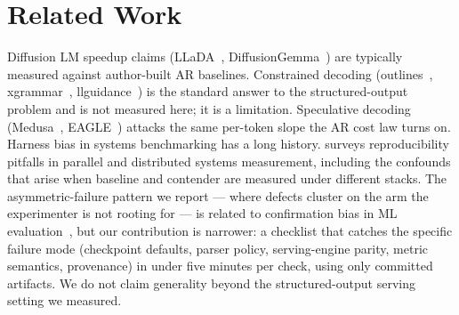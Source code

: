 \section{Related Work}
\label{sec:related} Diffusion LM speedup claims (LLaDA~\cite{llada2025},
DiffusionGemma~\cite{diffusiongemma}) are typically measured against
author-built AR baselines. Constrained decoding
(outlines~\cite{outlines2024}, xgrammar~\cite{xgrammar2024},
llguidance~\cite{llguidance}) is the standard answer to the structured-output
problem and is not measured here; it is a limitation. Speculative decoding
(Medusa~\cite{medusa2024}, EAGLE~\cite{eagle2024}) attacks the same per-token
slope the AR cost law turns on. Harness bias in systems benchmarking has a long history.
\cite{hoefler2021} surveys reproducibility pitfalls in parallel and
distributed systems measurement, including the confounds that arise when
baseline and contender are measured under different stacks. The
asymmetric-failure pattern we report --- where defects cluster on the arm
the experimenter is not rooting for --- is related to confirmation bias in
ML evaluation~\cite{hoefler2021}, but our contribution is narrower: a
checklist that catches the specific failure mode (checkpoint defaults, parser
policy, serving-engine parity, metric semantics, provenance) in under five
minutes per check, using only committed artifacts. We do not claim
generality beyond the structured-output serving setting we measured.
